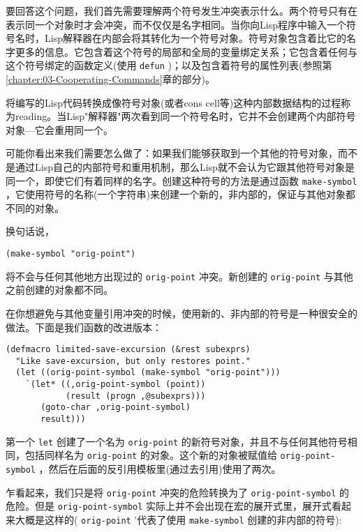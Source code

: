 要回答这个问题，我们首先需要理解两个符号发生冲突表示什么。两个符号只有在表示同一个对象时才会冲突，而不仅仅是名字相同。当你向Lisp程序中输入一个符号名时，Lisp解释器在内部会将其转化为一个符号对象。符号对象包含着比它的名字更多的信息。它包含着这个符号的局部和全局的变量绑定关系；它包含着任何与这个符号绑定的函数定义(使用 \texttt{defun} )；以及包含着符号的属性列表(参照第\ref{chapter:03-Cooperating-Commands}章的部分)。

将编写的Lisp代码转换成像符号对象(或者cons cell等)这种内部数据结构的过程称为reading。当Lisp"解释器"两次看到同一个符号名时，它并不会创建两个内部符号对象---它会重用同一个。

可能你看出来我们需要怎么做了：如果我们能够获取到一个其他的符号对象，而不是通过Lisp自己的内部符号和重用机制，那么Lisp就不会认为它跟其他符号对象是同一个，即使它们有着同样的名字。创建这种符号的方法是通过函数 \texttt{make-symbol} ，它使用符号的名称(一个字符串)来创建一个新的，非内部的，保证与其他对象都不同的对象。

换句话说，

\begin{verbatim}
(make-symbol "orig-point")
\end{verbatim}

将不会与任何其他地方出现过的 \texttt{orig-point} 冲突。新创建的 \texttt{orig-point} 与其他之前创建的对象都不同。

在你想避免与其他变量引用冲突的时候，使用新的、非内部的符号是一种很安全的做法。下面是我们函数的改进版本：

\begin{verbatim}
(defmacro limited-save-excursion (&rest subexprs)
  "Like save-excursion, but only restores point."
  (let ((orig-point-symbol (make-symbol "orig-point")))
    `(let* ((,orig-point-symbol (point))
            (result (progn ,@subexprs)))
       (goto-char ,orig-point-symbol)
       result)))
\end{verbatim}

第一个 \texttt{let} 创建了一个名为 \texttt{orig-point} 的新符号对象，并且不与任何其他符号相同，包括同样名为 \texttt{orig-point} 的对象。这个新的对象被赋值给 \texttt{orig-point-symbol} ，然后在后面的反引用模板里(通过去引用)使用了两次。

乍看起来，我们只是将 \texttt{orig-point} 冲突的危险转换为了 \texttt{orig-point-symbol} 的危险。但是 \texttt{orig-point-symbol} 实际上并不会出现在宏的展开式里，展开式看起来大概是这样的( \texttt{orig-point} '代表了使用 \texttt{make-symbol} 创建的非内部的符号):

